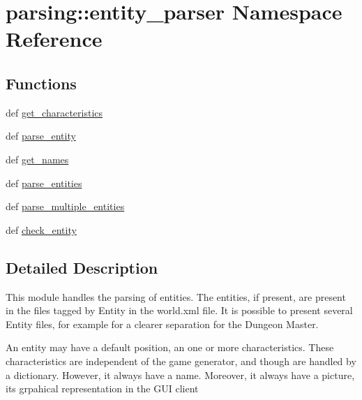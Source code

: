 \hypertarget{namespaceparsing_1_1entity__parser}{\section{parsing\-:\-:entity\-\_\-parser \-Namespace \-Reference}
\label{namespaceparsing_1_1entity__parser}
}
\subsection*{\-Functions}
\begin{DoxyCompactItemize}
\item 
def \hyperlink{namespaceparsing_1_1entity__parser_a0337ea3f75c52944f6533f83e766b112}{get\-\_\-characteristics}
\item 
def \hyperlink{namespaceparsing_1_1entity__parser_ac26e49f3eb32b698c1413382d0409431}{parse\-\_\-entity}
\item 
def \hyperlink{namespaceparsing_1_1entity__parser_af7d554c17e8d278d08731974af2b11d3}{get\-\_\-names}
\item 
def \hyperlink{namespaceparsing_1_1entity__parser_a877bd13b04dcd2ca5d9bee189127a72d}{parse\-\_\-entities}
\item 
def \hyperlink{namespaceparsing_1_1entity__parser_a5cfe2d081752826980ab8ebcaa85c702}{parse\-\_\-multiple\-\_\-entities}
\item 
def \hyperlink{namespaceparsing_1_1entity__parser_a5e09a935f78484fe6b2f6cefee327f51}{check\-\_\-entity}
\end{DoxyCompactItemize}


\subsection{\-Detailed \-Description}
\begin{DoxyVerb}
This module handles the parsing of entities.
The entities, if present, are present in the files tagged by Entity in the
world.xml file.
It is possible to present several Entity files, for example for a clearer
separation for the Dungeon Master.

An entity may have a default position, an one or more characteristics.
These characteristics are independent of the game generator, and though are
handled by a dictionary. However, it always have a name. Moreover,
it always have a picture, its grpahical representation in the GUI client
\end{DoxyVerb}
 

